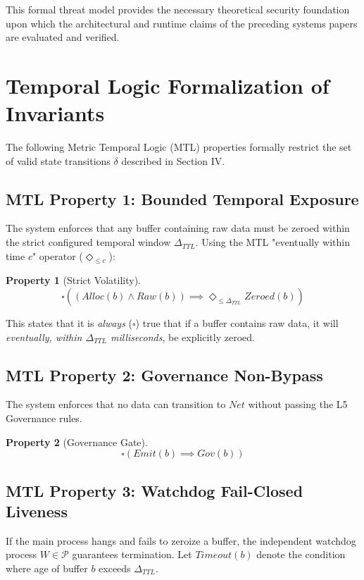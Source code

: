 \documentclass[conference]{IEEEtran}
\newtheorem{property}{Property}
\begin{document}
This formal threat model provides the necessary theoretical security foundation upon which the architectural and runtime claims of the preceding systems papers are evaluated and verified.


\appendices

\section{Temporal Logic Formalization of Invariants}
The following Metric Temporal Logic (MTL) properties formally restrict the set of valid state transitions $\delta$ described in Section IV. 

\subsection{MTL Property 1: Bounded Temporal Exposure}
The system enforces that any buffer containing raw data must be zeroed within the strict configured temporal window $\Delta_{TTL}$. Using the MTL "eventually within time $c$" operator ($\Diamond_{\le c}$):

\begin{property}[Strict Volatility]
\begin{equation}
\square \left( (Alloc(b) \land Raw(b)) \implies \Diamond_{\le \Delta_{TTL}} Zeroed(b) \right)
\end{equation}
\end{property}
This states that it is \textit{always} ($\square$) true that if a buffer contains raw data, it will \textit{eventually, within $\Delta_{TTL}$ milliseconds}, be explicitly zeroed.

\subsection{MTL Property 2: Governance Non-Bypass}
The system enforces that no data can transition to $Net$ without passing the L5 Governance rules.

\begin{property}[Governance Gate]
\begin{equation}
\square \left( Emit(b) \implies Gov(b) \right)
\end{equation}
\end{property}

\subsection{MTL Property 3: Watchdog Fail-Closed Liveness}
If the main process hangs and fails to zeroize a buffer, the independent watchdog process $W \in \mathcal{P}$ guarantees termination. Let $Timeout(b)$ denote the condition where age of buffer $b$ exceeds $\Delta_{TTL}$.
\end{document}
